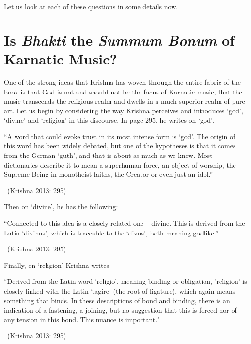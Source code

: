 Let us look at each of these questions in some details now.


\section*{Is \textit{Bhakti} the \textit{Summum Bonum} of Karnatic Music?}

One of the strong ideas that Krishna has woven through the entire fabric of the book is that God is not and should not be the focus of Karnatic music, that the music transcends the religious realm and dwells in a much superior realm of pure art. Let us begin by considering the way Krishna perceives and introduces ‘god’, ‘divine’ and ‘religion’ in this discourse. In page 295, he writes on ‘god’,

\begin{myquote}
“A word that could evoke trust in its most intense form is ‘god’. The origin of this word has been widely debated, but one of the hypotheses is that it comes from the German ‘guth’, and that is about as much as we know. Most dictionaries describe it to mean a superhuman force, an object of worship, the Supreme Being in monotheist faiths, the Creator or even just an idol.” 

~\hfill (Krishna 2013: 295)
\end{myquote}

Then on ‘divine’, he has the following:

\begin{myquote}
“Connected to this idea is a closely related one – divine. This is derived from the Latin ‘divinus’, which is traceable to the ‘divus’, both meaning godlike.” 

~\hfill (Krishna 2013: 295)
\end{myquote}

Finally, on ‘religion’ Krishna writes:

\begin{myquote}
“Derived from the Latin word ‘religio’, meaning binding or obligation, ‘religion’ is closely linked with the Latin ‘lagire’ (the root of ligature), which again means something that binds. In these descriptions of bond and binding, there is an indication of a fastening, a joining, but no suggestion that this is forced nor of any tension in this bond. This nuance is important.” 

~\hfill (Krishna 2013: 295)
\end{myquote}

